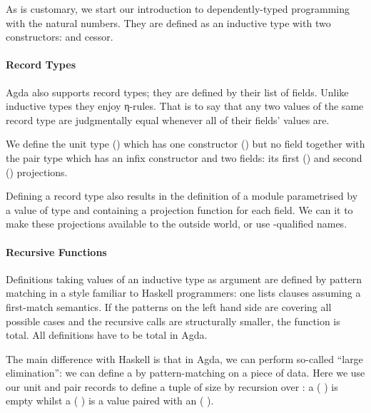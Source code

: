 As is customary, we start our introduction to dependently-typed programming with
the natural numbers. They are defined as an inductive type with two
constructors:  and cessor.


\paragraph{Record Types}\label{par:recordtypes}

Agda also supports record types; they are defined by their list of fields.
Unlike inductive types they enjoy η-rules. That is to say that any two
values of the same record type are judgmentally equal whenever all of their
fields' values are.

We define the unit type () which has one constructor () but no
field together with the pair type  which has an infix constructor
\AIC{\_,\_} and two fields: its first () and second ()
projections.

\begin{minipage}{0.5\textwidth}
\end{minipage}
\begin{minipage}{0.5\textwidth}
\end{minipage}

Defining a record type  also results in the definition of a module 
parametrised by a value of type  and containing a projection function
for each field. We can  it to make these projections available to the
outside world, or use -qualified names.

\paragraph{Recursive Functions}

Definitions taking values of an inductive type as argument are defined by
pattern matching in a style familiar to Haskell programmers: one lists
clauses assuming a first-match semantics. If the patterns on the left hand
side are covering all possible cases and the recursive calls are structurally
smaller, the function is total. All definitions have to be total in Agda.

The main difference with Haskell is that in Agda, we can perform so-called
``large elimination'': we can define a  by pattern-matching on a
piece of data. Here we use our unit and pair records to define a tuple of
size  by recursion over : a ( ) is empty
whilst a ( ) is a value paired with an ( ).

